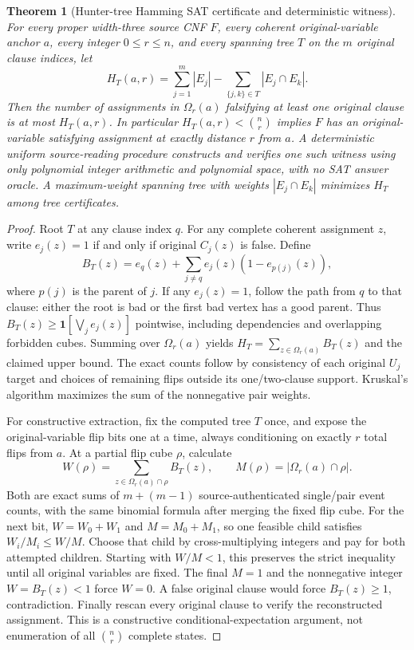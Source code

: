 \documentclass[11pt]{article}
\newtheorem{theorem}{Theorem}
\newcommand{\bin}[2]{\binom{#1}{#2}}
\begin{document}
\begin{theorem}[Hunter-tree Hamming SAT certificate and deterministic witness]
For every proper width-three source CNF $F$, every coherent original-variable anchor $a$, every integer $0\le r\le n$, and every spanning tree $T$ on the $m$ original clause indices, let
\[
H_T(a,r)=\sum_{j=1}^{m}|E_j|-\sum_{\{j,k\}\in T}|E_j\cap E_k|.
\]
Then the number of assignments in $\Omega_r(a)$ falsifying at least one original clause is at most $H_T(a,r)$. In particular $H_T(a,r)<\bin nr$ implies $F$ has an original-variable satisfying assignment at exactly distance $r$ from $a$. A deterministic uniform source-reading procedure constructs and verifies one such witness using only polynomial integer arithmetic and polynomial space, with \emph{no} SAT answer oracle. A maximum-weight spanning tree with weights $|E_j\cap E_k|$ minimizes $H_T$ among tree certificates.
\end{theorem}
\begin{proof}
Root $T$ at any clause index $q$. For any complete coherent assignment $z$, write $e_j(z)=1$ if and only if original $C_j(z)$ is false. Define
\[
B_T(z)=e_q(z)+\sum_{j\ne q}e_j(z)(1-e_{p(j)}(z)),
\]
where $p(j)$ is the parent of $j$. If any $e_j(z)=1$, follow the path from $q$ to that clause: either the root is bad or the first bad vertex has a good parent. Thus $B_T(z)\ge\mathbf 1[\bigvee_j e_j(z)]$ pointwise, including dependencies and overlapping forbidden cubes. Summing over $\Omega_r(a)$ yields $H_T=\sum_{z\in\Omega_r(a)}B_T(z)$ and the claimed upper bound. The exact counts follow by consistency of each original $U_j$ target and choices of remaining flips outside its one/two-clause support. Kruskal's algorithm maximizes the sum of the nonnegative pair weights.

For constructive extraction, fix the computed tree $T$ once, and expose the original-variable flip bits one at a time, always conditioning on exactly $r$ total flips from $a$. At a partial flip cube $\rho$, calculate
\[
W(\rho)=\sum_{z\in\Omega_r(a)\cap\rho}B_T(z),\qquad
M(\rho)=|\Omega_r(a)\cap\rho|.
\]
Both are exact sums of $m+(m-1)$ source-authenticated single/pair event counts, with the same binomial formula after merging the fixed flip cube. For the next bit, $W=W_0+W_1$ and $M=M_0+M_1$, so one feasible child satisfies $W_i/M_i\le W/M$. Choose that child by cross-multiplying integers and pay for both attempted children. Starting with $W/M<1$, this preserves the strict inequality until all original variables are fixed. The final $M=1$ and the nonnegative integer $W=B_T(z)<1$ force $W=0$. A false original clause would force $B_T(z)\ge1$, contradiction. Finally rescan every original clause to verify the reconstructed assignment. This is a constructive conditional-expectation argument, not enumeration of all $\bin nr$ complete states.
\end{proof}
\end{document}
